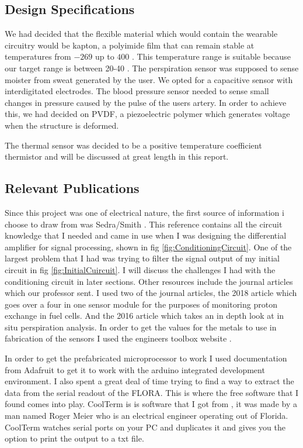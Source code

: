 \documentclass[12pt,a4paper]{report}
\begin{document}
\subsection{Design Specifications}

We had decided that the flexible material which would contain the wearable circuitry would be kapton, a polyimide film that can remain stable at temperatures from $-269$ \textcelsius{} up to $400$ \textcelsius{}. This temperature range is suitable because our target range is between 20-40 \textcelsius{}. The perspiration sensor was supposed to sense moister from sweat generated by the user. We opted for a capacitive sensor with interdigitated electrodes. The blood pressure sensor needed to sense small changes in pressure caused by the pulse of the users artery. In order to achieve this, we had decided on PVDF, a piezoelectric polymer which generates voltage when the structure is deformed.\par
The thermal sensor was decided to be a positive temperature coefficient thermistor and will be discussed at great length in this report.

\subsection{Relevant Publications}

Since this project was one of electrical nature, the first source of information i choose to draw from was Sedra/Smith \cite{Sedra2010}. This reference contains all the circuit knowledge that I needed and came in use when I was designing the differential amplifier for signal processing, shown in fig \ref{fig:ConditioningCircuit}. One of the largest problem that I had was trying to filter the signal output of my initial circuit in fig \ref{fig:InitialCuircuit}. I will discuss the challenges I had with the conditioning circuit in later sections. Other resources include the journal articles which our professor sent. I used two of the journal articles, the 2018 article \cite{Sensors2018} which goes over a four in one sensor module for the purposes of monitoring proton exchange in fuel cells. And the 2016 article \cite{Nature2016} which takes an in depth look at in situ perspiration analysis. In order to get the values for the metals to use in fabrication of the sensors I used the engineers toolbox website \cite{Etool}.
\par

In order to get the prefabricated microprocessor to work I used documentation from Adafruit \cite{ADA} to get it to work with the arduino integrated development environment. I also spent a great deal of time trying to find a way to extract the data from the serial readout of the FLORA. This is where the free software that I found comes into play. CoolTerm is is software that I got from \cite{CoolTerm}, it was made by a man named Roger Meier who is an electrical engineer operating out of Florida. CoolTerm watches serial ports on your PC and duplicates it and gives you the option to print the output to a txt file.
\end{document}
